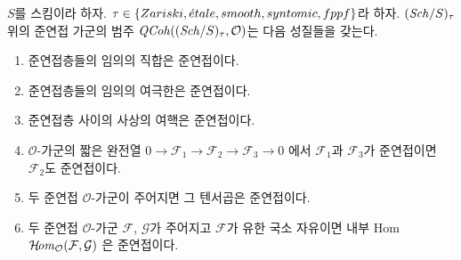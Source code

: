 \begin{lemma}
\label{lemma-properties-quasi-coherent-on-big}
$S$를 스킴이라 하자.
$\tau \in \{Zariski, \linebreak[0] \etale, \linebreak[0]
smooth, \linebreak[0] syntomic, \linebreak[0] fppf\}$라 하자.
$(\mathit{Sch}/S)_\tau$ 위의 준연접 가군의 범주
$\mathit{QCoh}((\mathit{Sch}/S)_\tau, \mathcal{O})$는 다음 성질들을 갖는다.
\begin{enumerate}
\item 준연접층들의 임의의 직합은 준연접이다.
\item 준연접층들의 임의의 여극한은 준연접이다.
\item 준연접층 사이의 사상의 여핵은 준연접이다.
\item $\mathcal{O}$-가군의 짧은 완전열
$0 \to \mathcal{F}_1 \to \mathcal{F}_2 \to \mathcal{F}_3 \to 0$
에서 $\mathcal{F}_1$과 $\mathcal{F}_3$가 준연접이면
$\mathcal{F}_2$도 준연접이다.
\item 두 준연접 $\mathcal{O}$-가군이 주어지면 그 텐서곱은 준연접이다.
\item 두 준연접 $\mathcal{O}$-가군 $\mathcal{F}$, $\mathcal{G}$가
주어지고 $\mathcal{F}$가 유한 국소 자유이면 내부 Hom
$\mathop{\mathcal{H}\!\mathit{om}}\nolimits_\mathcal{O}(\mathcal{F}, \mathcal{G})$
은 준연접이다.
\end{enumerate}
\end{lemma}

